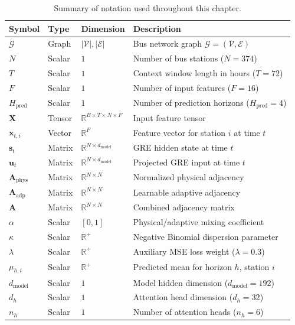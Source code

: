 \begin{table}[H]
\centering
\caption{Summary of notation used throughout this chapter.}
\label{Tab.notation}
\begin{tabular}{llll}
\toprule
Symbol & Type & Dimension & Description \\
\midrule
$\mathcal{G}$ & Graph & $|\mathcal{V}|, |\mathcal{E}|$ & Bus network graph $\mathcal{G} = (\mathcal{V}, \mathcal{E})$ \\
$N$ & Scalar & $1$ & Number of bus stations ($N = 374$) \\
$T$ & Scalar & $1$ & Context window length in hours ($T = 72$) \\
$F$ & Scalar & $1$ & Number of input features ($F = 16$) \\
$H_{\text{pred}}$ & Scalar & $1$ & Number of prediction horizons ($H_{\text{pred}} = 4$) \\
$\mathbf{X}$ & Tensor & $\mathbb{R}^{B \times T \times N \times F}$ & Input feature tensor \\
$\mathbf{x}_{t,i}$ & Vector & $\mathbb{R}^{F}$ & Feature vector for station $i$ at time $t$ \\
$\mathbf{s}_t$ & Matrix & $\mathbb{R}^{N \times d_{\text{model}}}$ & GRE hidden state at time $t$ \\
$\mathbf{u}_t$ & Matrix & $\mathbb{R}^{N \times d_{\text{model}}}$ & Projected GRE input at time $t$ \\
$\mathbf{A}_{\text{phys}}$ & Matrix & $\mathbb{R}^{N \times N}$ & Normalized physical adjacency \\
$\mathbf{A}_{\text{adp}}$ & Matrix & $\mathbb{R}^{N \times N}$ & Learnable adaptive adjacency \\
$\mathbf{A}$ & Matrix & $\mathbb{R}^{N \times N}$ & Combined adjacency matrix \\
$\alpha$ & Scalar & $[0,1]$ & Physical/adaptive mixing coefficient \\
$\kappa$ & Scalar & $\mathbb{R}^{+}$ & Negative Binomial dispersion parameter \\
$\lambda$ & Scalar & $\mathbb{R}^{+}$ & Auxiliary MSE loss weight ($\lambda = 0.3$) \\
$\mu_{h,i}$ & Scalar & $\mathbb{R}^{+}$ & Predicted mean for horizon $h$, station $i$ \\
$d_{\text{model}}$ & Scalar & $1$ & Model hidden dimension ($d_{\text{model}} = 192$) \\
$d_h$ & Scalar & $1$ & Attention head dimension ($d_h = 32$) \\
$n_h$ & Scalar & $1$ & Number of attention heads ($n_h = 6$) \\

\end{tabular}
\end{table}
